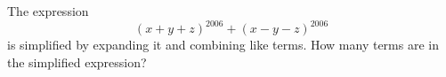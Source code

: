 The expression
\[(x+y+z)^{2006}+(x-y-z)^{2006}\]
is simplified by expanding it and combining like terms. How many terms are in the simplified expression?

